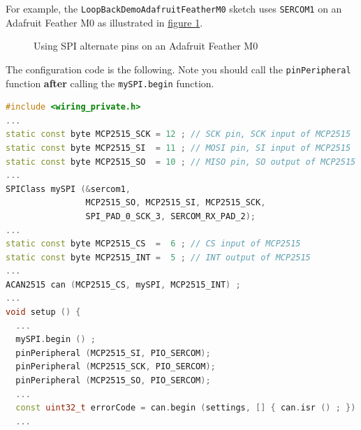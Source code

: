 \documentclass[10pt, a4paper, obeyspaces, openany]{extarticle}
\newcommand\labelFigure[1]{\label{fig:#1}}
\newcommand\refFigure[2]{\hyperref[fig:#2]{figure \ref*{fig:#2}{\ifthenelse{\equal{#1}{}}{}{.#1}}}}
\begin{document}
For example, the \texttt{LoopBackDemoAdafruitFeatherM0} sketch uses \texttt{SERCOM1} on an Adafruit Feather M0 as illustrated in \refFigure{}{figureAdafruitFeatherM0AlternatePins}.
\begin{figure}[!ht]
  \small
  \centering
  \caption{Using SPI alternate pins on an Adafruit Feather M0}
  \labelFigure{figureAdafruitFeatherM0AlternatePins}
\end{figure}

The configuration code is the following. Note you should call the \texttt{pinPeripheral} function \textbf{after} calling the \texttt{mySPI.begin} function.
{ \small\begin{lstlisting}[language=c++]
#include <wiring_private.h>
...
static const byte MCP2515_SCK = 12 ; // SCK pin, SCK input of MCP2515 
static const byte MCP2515_SI  = 11 ; // MOSI pin, SI input of MCP2515  
static const byte MCP2515_SO  = 10 ; // MISO pin, SO output of MCP2515 
...
SPIClass mySPI (&sercom1,
                MCP2515_SO, MCP2515_SI, MCP2515_SCK,
                SPI_PAD_0_SCK_3, SERCOM_RX_PAD_2);
...
static const byte MCP2515_CS  =  6 ; // CS input of MCP2515 
static const byte MCP2515_INT =  5 ; // INT output of MCP2515
...
ACAN2515 can (MCP2515_CS, mySPI, MCP2515_INT) ;
...
void setup () {
  ...
  mySPI.begin () ;
  pinPeripheral (MCP2515_SI, PIO_SERCOM);
  pinPeripheral (MCP2515_SCK, PIO_SERCOM);
  pinPeripheral (MCP2515_SO, PIO_SERCOM);
  ...
  const uint32_t errorCode = can.begin (settings, [] { can.isr () ; }) ;
  ...
\end{lstlisting}}
\end{document}
